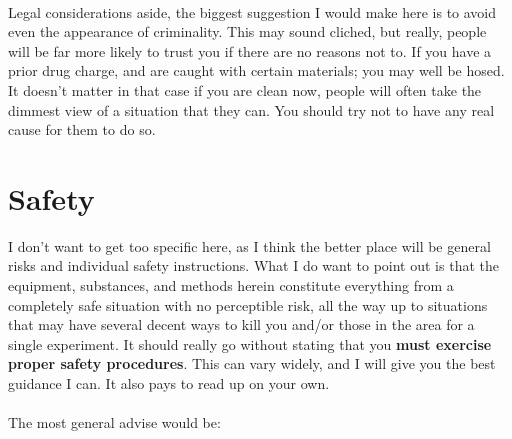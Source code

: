 \documentclass{book}
\begin{document}
\\
Legal considerations aside, the biggest suggestion I would make here is to avoid even the appearance of criminality.  This may sound cliched, but really, people will be far more likely to trust you if there are no reasons not to.  If you have a prior drug charge, and are caught with certain materials; you may well be hosed.  It doesn't matter in that case if you are clean now, people will often take the dimmest view of a situation that they can.  You should try not to have any real cause for them to do so.

\section{Safety}
I don't want to get too specific here, as I think the better place will be general risks and individual safety instructions.  What I do want to point out is that the equipment, substances, and methods herein constitute everything from a completely safe situation with no perceptible risk, all the way up to situations that may have several decent ways to kill you and/or those in the area for a single experiment.  It should really go without stating that you \textbf{must exercise proper safety procedures}.  This can vary widely, and I will give you the best guidance I can.  It also pays to read up on your own.\\
\\
The most general advise would be:\\
\end{document}
